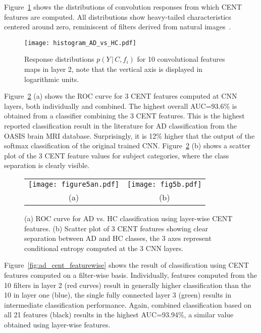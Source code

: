 \documentclass[10pt,onecolumn]{article}
\begin{document}
Figure~\ref{fig:neuron_response} shows the distributions of convolution responses from which CENT features are computed. All distributions show heavy-tailed characteristics centered around zero, reminiscent of filters derived from natural images~\cite{simoncelli2001natural,simon2007scene}.

\begin{figure}[t]
\begin{center}
   \texttt{[image: histogram\_AD\_vs\_HC.pdf]}
\end{center}
   \caption{Response distributions $p(Y\, | \,C,f_i)$ for 10 convolutional features maps in layer 2, note that the vertical axis is displayed in logarithmic units.}
\label{fig:neuron_response}
\end{figure}

Figure~\ref{fig:ad_cent_layerwise} (a) shows the ROC curve for 3 CENT features computed at CNN layers, both individually and combined. The highest overall AUC=93.6\% is obtained from a classifier combining the 3 CENT features. This is the highest reported classification result in the literature for AD classification from the OASIS brain MRI database. Surprisingly, it is 12\% higher that the output of the softmax classification  of the original trained CNN. Figure~\ref{fig:ad_cent_layerwise} (b) shows a scatter plot of the 3 CENT feature values for subject categories, where the class separation is clearly visible.

\begin{figure}[t]
\begin{center}
\begin{tabular}{cc}
\texttt{[image: figure5an.pdf]} &
\texttt{[image: fig5b.pdf]} \\
(a) & (b)
\end{tabular}
\end{center}
   \caption{(a) ROC curve for AD vs. HC classification using layer-wise CENT features. (b) Scatter plot of 3 CENT features showing clear separation between AD and HC classes, the 3 axes represent conditional entropy computed at the 3 CNN layers.}
\label{fig:ad_cent_layerwise}
\end{figure}
Figure~\ref{fig:ad_cent_featurewise} shows the result of classification using CENT features computed on a filter-wise basis. Individually, features computed from the 10 filters in layer 2 (red curves) result in generally higher classification than the 10 in layer one (blue), the single fully connected layer 3 (green) results in intermediate classification performance. Again, combined classification based on all 21 features (black) results in the highest AUC=93.94\%, a similar value obtained using layer-wise features.
\end{document}
